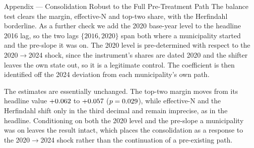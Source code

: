 
\begin{frame}{Appendix --- Consolidation Robust to the Full Pre-Treatment Path}
\hypertarget{app:ptrobust}{}
\small
The balance test clears the margin, effective-N and top-two share, with the Herfindahl borderline. As a further check we add the 2020 base-year level to the headline 2016 lag, so the two lags $\{2016, 2020\}$ span both where a municipality started and the pre-slope it was on. The 2020 level is pre-determined with respect to the 2020$\to$2024 shock, since the instrument's shares are dated 2020 and the shifter leaves the own state out, so it is a legitimate control. The coefficient is then identified off the 2024 deviation from each municipality's own path.
\smallskip
\begin{center}
\scriptsize
\resizebox{\linewidth}{!}{}
\end{center}
\smallskip
\footnotesize The estimates are essentially unchanged. The top-two margin moves from its headline value $+0.062$ to $+0.057$ ($p=0.029$), while effective-N and the Herfindahl shift only in the third decimal and remain imprecise, as in the headline. Conditioning on both the 2020 level and the pre-slope a municipality was on leaves the result intact, which places the consolidation as a response to the 2020$\to$2024 shock rather than the continuation of a pre-existing path. \hfill\hyperlink{src:pretrend}{}
\end{frame}
